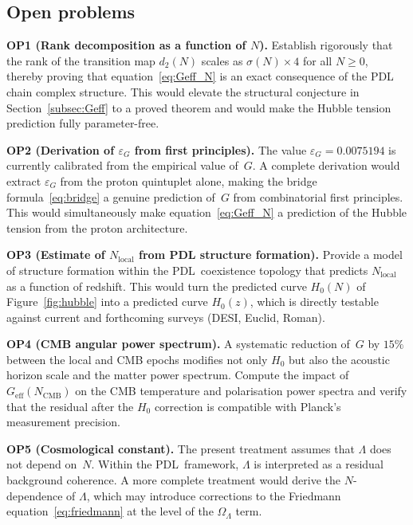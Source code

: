 \documentclass[11pt,a4paper]{article}
\theoremstyle{definition}
\newcommand{\PDL}{\textnormal{PDL}}
\newcommand{\epsg}{\varepsilon_G}
\newcommand{\Geff}{G_{\mathrm{eff}}}
\newcommand{\Hzero}{H_0}
\newcommand{\sig}{\sigma}
\newcommand{\dmap}[1]{d_{#1}}
\begin{document}
\subsection{Open problems}
\label{subsec:open}

\medskip\noindent\textbf{OP1 (Rank decomposition as a function of $N$).} Establish rigorously that the rank of the transition map $\dmap{2}(N)$ scales as $\sig(N) \times 4$ for all $N \geq 0$, thereby proving that equation~\eqref{eq:Geff_N} is an exact consequence of the PDL chain complex structure. This would elevate the structural conjecture in Section~\ref{subsec:Geff} to a proved theorem and would make the Hubble tension prediction fully parameter-free.

\medskip\noindent\textbf{OP2 (Derivation of $\epsg$ from first principles).} The value $\epsg = 0.0075194$ is currently calibrated from the empirical value of~$G$.\cite{Bridge_Formula_PDL_2026} A complete derivation would extract $\epsg$ from the proton quintuplet alone, making the bridge formula~\eqref{eq:bridge} a genuine prediction of~$G$ from combinatorial first principles. This would simultaneously make equation~\eqref{eq:Geff_N} a prediction of the Hubble tension from the proton architecture.

\medskip\noindent\textbf{OP3 (Estimate of $N_{\mathrm{local}}$ from PDL structure formation).} Provide a model of structure formation within the \PDL\ coexistence topology that predicts $N_{\mathrm{local}}$ as a function of redshift. This would turn the predicted curve $\Hzero(N)$ of Figure~\ref{fig:hubble} into a predicted curve $\Hzero(z)$, which is directly testable against current and forthcoming surveys (DESI, Euclid, Roman).

\medskip\noindent\textbf{OP4 (CMB angular power spectrum).} A systematic reduction of~$G$ by $15\%$ between the local and CMB epochs modifies not only $\Hzero$ but also the acoustic horizon scale and the matter power spectrum. Compute the impact of $\Geff(N_{\mathrm{CMB}})$ on the CMB temperature and polarisation power spectra and verify that the residual after the $\Hzero$ correction is compatible with Planck's measurement precision.

\medskip\noindent\textbf{OP5 (Cosmological constant).} The present treatment assumes that $\Lambda$ does not depend on~$N$. Within the \PDL\ framework, $\Lambda$ is interpreted as a residual background coherence.\cite{PDL_Main_2026} A more complete treatment would derive the $N$-dependence of $\Lambda$, which may introduce corrections to the Friedmann equation~\eqref{eq:friedmann} at the level of the $\Omega_\Lambda$ term.
\end{document}
